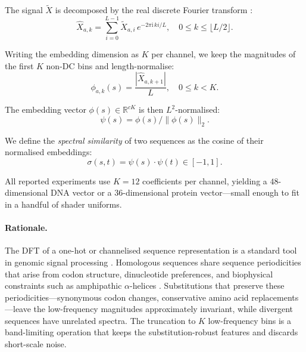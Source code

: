 \documentclass[twocolumn,11pt,a4paper]{article}
\theoremstyle{definition}
\theoremstyle{remark}
\newcommand{\R}{\mathbb{R}}
\begin{document}
The signal $\tilde{X}$ is decomposed by the real discrete Fourier transform
\citep{oppenheim2009}:
\begin{equation}
    \hat{X}_{a,k} = \sum_{i=0}^{L-1} \tilde{X}_{a,i}\, e^{-2\pi \mathrm{i}\, ki / L},
    \quad 0 \le k \le \lfloor L/2 \rfloor.
\end{equation}

Writing the embedding dimension as $K$ per channel, we keep the magnitudes
of the first $K$ non-DC bins and length-normalise:
\begin{equation}
    \phi_{a,k}(s) = \frac{|\hat{X}_{a,k+1}|}{L}, \quad 0 \le k < K.
\end{equation}

The embedding vector $\phi(s) \in \R^{cK}$ is then $L^2$-normalised:
\begin{equation}
    \psi(s) = \phi(s) / \|\phi(s)\|_2.
\end{equation}

We define the \emph{spectral similarity} of two sequences as the cosine of
their normalised embeddings:
\begin{equation}
    \sigma(s, t) = \psi(s) \cdot \psi(t) \in [-1, 1].
    \label{eq:cos}
\end{equation}

All reported experiments use $K = 12$ coefficients per channel, yielding a
$48$-dimensional DNA vector or a $36$-dimensional protein vector---small
enough to fit in a handful of shader uniforms.

\paragraph{Rationale.} The DFT of a one-hot or channelised sequence
representation is a standard tool in genomic signal processing
\citep{anastassiou2001,trifonov1980}. Homologous sequences share sequence
periodicities that arise from codon structure, dinucleotide preferences, and
biophysical constraints such as amphipathic $\alpha$-helices
\citep{voss1992,hoang2015,yin2014}. Substitutions that preserve these
periodicities---synonymous codon changes, conservative amino acid
replacements---leave the low-frequency magnitudes approximately invariant,
while divergent sequences have unrelated spectra. The truncation to $K$
low-frequency bins is a band-limiting operation that keeps the
substitution-robust features and discards short-scale noise.
\end{document}
